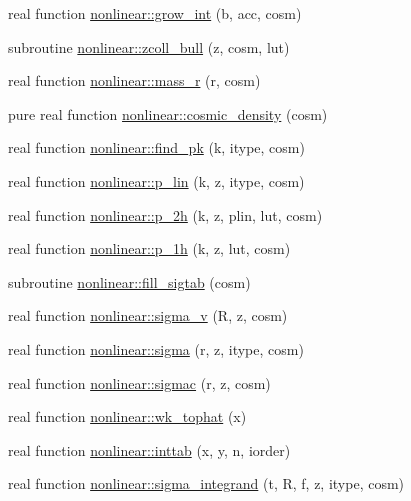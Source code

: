 \begin{DoxyCompactItemize}
\item 
real function \mbox{\hyperlink{namespacenonlinear_a2ccd15402588e67b26abc93ccf910de6}{nonlinear\+::grow\+\_\+int}} (b, acc, cosm)
\item 
subroutine \mbox{\hyperlink{namespacenonlinear_a53b6da6e807b30b0078e77b9900c33b6}{nonlinear\+::zcoll\+\_\+bull}} (z, cosm, lut)
\item 
real function \mbox{\hyperlink{namespacenonlinear_a164bc94a32486b7a39cab9d1d3ddbafb}{nonlinear\+::mass\+\_\+r}} (r, cosm)
\item 
pure real function \mbox{\hyperlink{namespacenonlinear_a8d293985858b08d5e5c5bbdcdc9d4280}{nonlinear\+::cosmic\+\_\+density}} (cosm)
\item 
real function \mbox{\hyperlink{namespacenonlinear_ad7792185b1262569016446c4cba41606}{nonlinear\+::find\+\_\+pk}} (k, itype, cosm)
\item 
real function \mbox{\hyperlink{namespacenonlinear_ad2f542da0cba1686588e83dec8ac7617}{nonlinear\+::p\+\_\+lin}} (k, z, itype, cosm)
\item 
real function \mbox{\hyperlink{namespacenonlinear_adbb028d781be22805e7c1468b4e795a8}{nonlinear\+::p\+\_\+2h}} (k, z, plin, lut, cosm)
\item 
real function \mbox{\hyperlink{namespacenonlinear_a6734815086cf4dca34d8677f1d763e3f}{nonlinear\+::p\+\_\+1h}} (k, z, lut, cosm)
\item 
subroutine \mbox{\hyperlink{namespacenonlinear_a0ec694303c1335ceb97e09d20f0ceb94}{nonlinear\+::fill\+\_\+sigtab}} (cosm)
\item 
real function \mbox{\hyperlink{namespacenonlinear_a66f93056c25bc48a5cfb206e596b47ad}{nonlinear\+::sigma\+\_\+v}} (R, z, cosm)
\item 
real function \mbox{\hyperlink{namespacenonlinear_a5ecb478e809d6e8e185d11dea143cd69}{nonlinear\+::sigma}} (r, z, itype, cosm)
\item 
real function \mbox{\hyperlink{namespacenonlinear_a2b1a2fe15822f8bfcf88ca9de9060e85}{nonlinear\+::sigmac}} (r, z, cosm)
\item 
real function \mbox{\hyperlink{namespacenonlinear_a96a394ea7d173aec659a73ff09f548c6}{nonlinear\+::wk\+\_\+tophat}} (x)
\item 
real function \mbox{\hyperlink{namespacenonlinear_ab7465123b12f301a0d4d5a80c8b35ab5}{nonlinear\+::inttab}} (x, y, n, iorder)
\item 
real function \mbox{\hyperlink{namespacenonlinear_a752ac5f748fd7d780ac59ee3a8b4d267}{nonlinear\+::sigma\+\_\+integrand}} (t, R, f, z, itype, cosm)

\end{DoxyCompactItemize}
